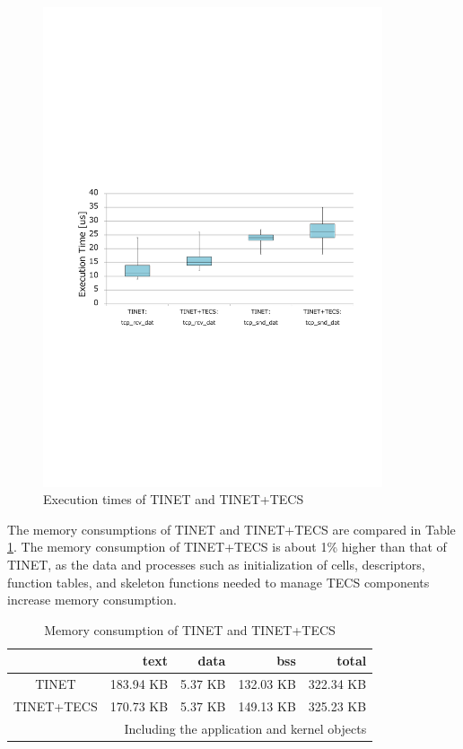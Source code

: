 \documentclass[a4j,12pt,oneside,openany,english]{jsbook}
\begin{document}
\begin{figure}[t]
    \centering
    \includegraphics[width=10cm,clip]{figure/EvaluationOfExecutionTime.pdf}
    \caption{Execution times of TINET and TINET+TECS}
    \label{fig:EvaluationOfExecutionTime}
\end{figure}

The memory consumptions of TINET and TINET+TECS are compared in Table \ref{tab:EvaluationOfMemoryConsumption}.
The memory consumption of TINET+TECS is about 1\% higher than that of TINET, as the data and processes such as initialization of cells, descriptors, function tables, and skeleton functions needed to manage TECS components increase memory consumption.

\begin{table}[t]
    \centering
    \caption{Memory consumption of TINET and TINET+TECS}
    \begin{tabular}{c|r|r|r|r}
        \hline\hline
                    &   text       &  data    &   bss      &  total     \\ \hline
        TINET       &   183.94 KB  &  5.37 KB &  132.03 KB &  322.34 KB \\
        TINET+TECS  &   170.73 KB  &  5.37 KB &  149.13 KB &  325.23 KB \\
        \hline
        \multicolumn{5}{r}{Including the application and kernel objects}
    \end{tabular}
    \label{tab:EvaluationOfMemoryConsumption}
\end{table}
\end{document}
